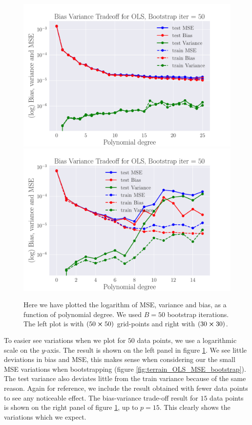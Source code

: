 \documentclass[reprint,english,notitlepage,aps,nobalancelastpage,nofootinbib]{revtex4-1}  %
\begin{document}
\begin{figure}[h]
	\includegraphics[width=\linewidth]{SRTM_BVT_OLS_n50_log.pdf}
	\endminipage\hfill
	\includegraphics[width=\linewidth]{SRTM_BVT_OLS_n30_log.pdf}
	\endminipage
	\caption{Here we have plotted the logarithm of MSE, variance and bias, as a function of polynomial degree. We used $B=50$ bootstrap iterations. The left plot is with $(50\cross50)$ grid-points and right with $(30\cross30)$.}
  \label{fig:terrain_OLS_BVT}
\end{figure}

To easier see variations when we plot for $50$ data points, we use a logarithmic scale on the $y$-axis. The result is shown on the left panel in figure \ref{fig:terrain_OLS_BVT}. We see little deviations in bias and MSE, this makes sense when considering our the small MSE variations when bootstrapping (figure \ref{fig:terrain_OLS_MSE_bootstrap}). The test variance also deviates little from the train variance because of the same reason. Again for reference, we include the result obtained with fewer data points to see any noticeable effect. The bias-variance trade-off result for $15$ data points is shown on the right panel of figure \ref{fig:terrain_OLS_BVT}, up to $p=15$. This clearly shows the variations which we expect.
\end{document}
